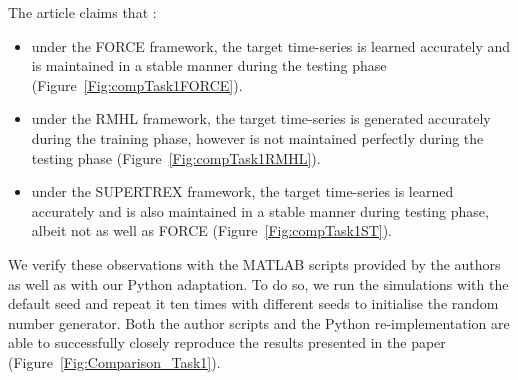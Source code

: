 The article claims that :
\begin{itemize}
\item under the FORCE framework, the target time-series is learned accurately and is maintained in a stable manner during the testing phase (Figure~\ref{Fig:compTask1FORCE}).
\item under the RMHL framework, the target time-series is generated accurately during the training phase, however is not maintained perfectly during the testing phase (Figure~\ref{Fig:compTask1RMHL}).
\item under the SUPERTREX framework, the target time-series is learned accurately and is also maintained in a stable manner during testing phase, albeit not as well as FORCE (Figure~\ref{Fig:compTask1ST}).
\end{itemize}

We verify these observations with the MATLAB scripts provided by the authors as well as with our Python adaptation. To do so, we run the simulations with the default seed and repeat it ten times with different seeds to initialise the random number generator.  Both the author scripts and the Python re-implementation are able to successfully closely reproduce the results presented in the paper (Figure~\ref{Fig:Comparison_Task1}).




